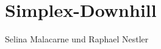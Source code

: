 \newcommand{\figref}[1]{Abbildung~\ref{#1}}
\newcommand{\chapref}[1]{Abschnitt~\ref{#1}~(\nameref{#1})}
\chapter{Simplex-Downhill}
Selina Malacarne und Raphael Nestler








